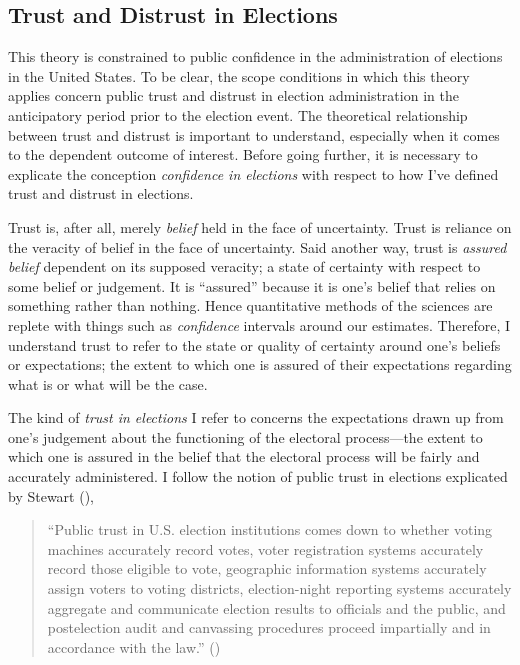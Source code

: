 \documentclass[
  12pt,
  letterpaper,
]{article}
\begin{document}
\subsection{Trust and Distrust in
Elections}\label{trust-and-distrust-in-elections}

This theory is constrained to public confidence in the administration of
elections in the United States. To be clear, the scope conditions in
which this theory applies concern public trust and distrust in election
administration in the anticipatory period prior to the election event.
The theoretical relationship between trust and distrust is important to
understand, especially when it comes to the dependent outcome of
interest. Before going further, it is necessary to explicate the
conception \emph{confidence in elections} with respect to how I've
defined trust and distrust in elections.

Trust is, after all, merely \emph{belief} held in the face of
uncertainty. Trust is reliance on the veracity of belief in the face of
uncertainty. Said another way, trust is \emph{assured belief} dependent
on its supposed veracity; a state of certainty with respect to some
belief or judgement. It is ``assured'' because it is one's belief that
relies on something rather than nothing. Hence quantitative methods of
the sciences are replete with things such as \emph{confidence} intervals
around our estimates. Therefore, I understand trust to refer to the
state or quality of certainty around one's beliefs or expectations; the
extent to which one is assured of their expectations regarding what is
or what will be the case.

The kind of \emph{trust in elections} I refer to concerns the
expectations drawn up from one's judgement about the functioning of the
electoral process---the extent to which one is assured in the belief
that the electoral process will be fairly and accurately administered. I
follow the notion of public trust in elections explicated by Stewart
(),

\begin{quote}
``Public trust in U.S. election institutions comes down to whether
voting machines accurately record votes, voter registration systems
accurately record those eligible to vote, geographic information systems
accurately assign voters to voting districts, election-night reporting
systems accurately aggregate and communicate election results to
officials and the public, and postelection audit and canvassing
procedures proceed impartially and in accordance with the law.''
()
\end{quote}
\end{document}
